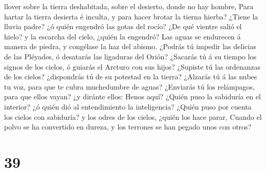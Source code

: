 llover sobre la tierra deshabitada, sobre el desierto, donde no hay
hombre,  Para hartar la tierra desierta é inculta, y para
hacer brotar la tierna hierba?  ¿Tiene la lluvia padre? ¿ó
quién engendró las gotas del rocío?  ¿De qué vientre salió
el hielo? y la escarcha del cielo, ¿quién la engendró?  Las
aguas se endurecen á manera de piedra, y congélase la haz del abismo.
 ¿Podrás tú impedir las delicias de las Pléyades, ó
desatarás las ligaduras del Orión?  ¿Sacarás tú á su tiempo
los signos de los cielos, ó guiarás el Arcturo con sus hijos?
 ¿Supiste tú las ordenanzas de los cielos? ¿dispondrás tú
de su potestad en la tierra?  ¿Alzarás tú á las nubes tu
voz, para que te cubra muchedumbre de aguas?  ¿Enviarás tú
los relámpagos, para que ellos vayan? ¿y diránte ellos: Henos aquí?
 ¿Quién puso la sabiduría en el interior? ¿ó quién dió al
entendimiento la inteligencia?  ¿Quién puso por cuenta los
cielos con sabiduría? y los odres de los cielos, ¿quién los hace parar,
 Cuando el polvo se ha convertido en dureza, y los terrones
se han pegado unos con otros?   

\hypertarget{section-38}{%
\section{39}\label{section-38}}

